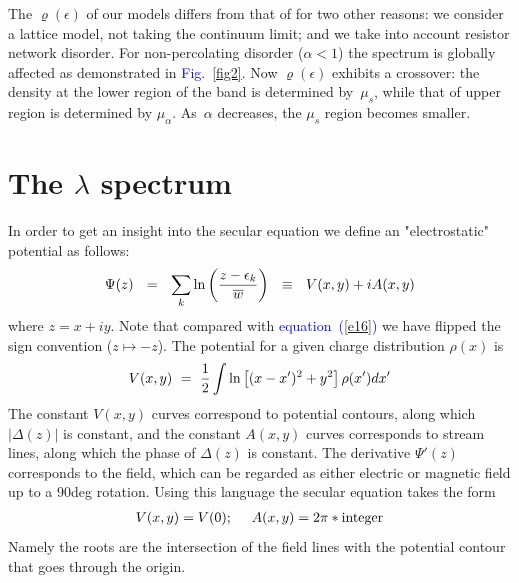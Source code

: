 \documentclass[aps,pre,floats,floatfix,twocolumn]{revtex4}
\newcommand{\be}[1]{\begin{eqnarray}\ifthenelse{#1=-1}{\nonumber}{\ifthenelse{#1=0}{}{\label{e#1}}}}
\newcommand{\eeq}{\end{eqnarray}}
\newcommand{\Eq}[1]{\textcolor{blue}{{equation}\!~(\ref{#1})}}
\newcommand{\Fig}[1]{\textcolor{blue}{Fig.}\!\!~\ref{#1}}
\begin{document}
The $\varrho(\epsilon)$ of our models differs from that of \cite{odh3} 
for two other reasons: we consider a lattice model, 
not taking the continuum limit; and we take into account 
resistor network disorder. For non-percolating disorder (${\alpha <1}$)
the spectrum is globally affected as demonstrated in \Fig{fig2}.  
Now $\varrho(\epsilon)$ exhibits a crossover: the density at the 
lower region of the band is determined by~${\mu_s}$, 
while that of upper region is determined by ${\mu_{\alpha}}$.
As~$\alpha$ decreases, the $\mu_s$ region becomes smaller.



\section{The $\lambda$ spectrum}

In order to get an insight into the secular equation we 
define an "electrostatic" potential as follows:
%
\be{22}
\Psi(z) \ \ = \ \ \sum_k \ln\left(\frac{z-\epsilon_k}{\overline{w}}\right) \ \ \equiv \ \ V(x,y)+iA(x,y)
\eeq
%
where ${z=x+iy}$.
 Note that compared with \Eq{e16} 
we have flipped the sign convention (${z\mapsto -z}$).
The potential for a given charge distribution $\rho(x)$ is 
%
\be{21}
V(x,y) \ = \ \frac{1}{2} \int \ln \left[(x-x')^2 + y^2\right] \rho(x')dx'
\eeq
%
The constant ${V(x,y)}$ curves correspond to potential contours,
along which $|\Delta(z)|$ is constant, and the constant ${A(x,y)}$ curves corresponds 
to stream lines, along which the phase of $\Delta(z)$ is constant. 
The derivative $\Psi'(z)$ corresponds to the field, which can be regarded as 
either electric or magnetic field up to a 90deg rotation.       
Using this language the secular equation takes the form
%
\be{21}
V(x,y)=V(0); \ \ \ \ A(x,y)=2\pi*\text{integer} 
\eeq
%
Namely the roots are the intersection of the field lines with the 
potential contour that goes through the origin. 
\end{document}
